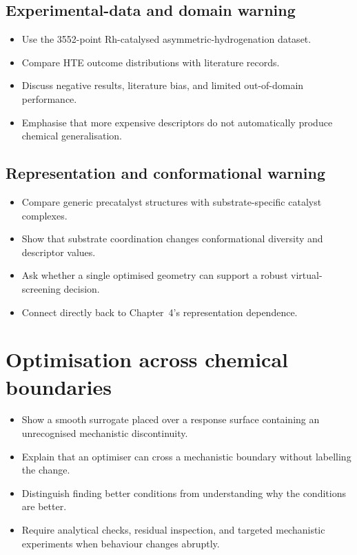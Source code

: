 \subsection{Experimental-data and domain warning}

\begin{itemize}
  \item Use the 3552-point Rh-catalysed asymmetric-hydrogenation dataset.
  \item Compare HTE outcome distributions with literature records.
  \item Discuss negative results, literature bias, and limited out-of-domain performance.
  \item Emphasise that more expensive descriptors do not automatically produce chemical generalisation.
\end{itemize}

\subsection{Representation and conformational warning}

\begin{itemize}
  \item Compare generic precatalyst structures with substrate-specific catalyst complexes.
  \item Show that substrate coordination changes conformational diversity and descriptor values.
  \item Ask whether a single optimised geometry can support a robust virtual-screening decision.
  \item Connect directly back to Chapter~4's representation dependence.
\end{itemize}

\section{Optimisation across chemical boundaries}

\begin{itemize}
  \item Show a smooth surrogate placed over a response surface containing an unrecognised mechanistic discontinuity.
  \item Explain that an optimiser can cross a mechanistic boundary without labelling the change.
  \item Distinguish finding better conditions from understanding why the conditions are better.
  \item Require analytical checks, residual inspection, and targeted mechanistic experiments when behaviour changes abruptly.
\end{itemize}

